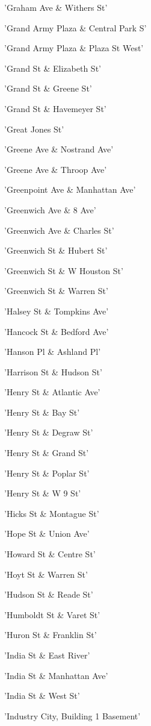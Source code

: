\documentclass[11pt]{article}
\begin{document}
\begin{enumerate*}
\item 'Graham Ave \& Withers St'
\item 'Grand Army Plaza \& Central Park S'
\item 'Grand Army Plaza \& Plaza St West'
\item 'Grand St \& Elizabeth St'
\item 'Grand St \& Greene St'
\item 'Grand St \& Havemeyer St'
\item 'Great Jones St'
\item 'Greene Ave \& Nostrand Ave'
\item 'Greene Ave \& Throop Ave'
\item 'Greenpoint Ave \& Manhattan Ave'
\item 'Greenwich Ave \& 8 Ave'
\item 'Greenwich Ave \& Charles St'
\item 'Greenwich St \& Hubert St'
\item 'Greenwich St \& W Houston St'
\item 'Greenwich St \& Warren St'
\item 'Halsey St \& Tompkins Ave'
\item 'Hancock St \& Bedford Ave'
\item 'Hanson Pl \& Ashland Pl'
\item 'Harrison St \& Hudson St'
\item 'Henry St \& Atlantic Ave'
\item 'Henry St \& Bay St'
\item 'Henry St \& Degraw St'
\item 'Henry St \& Grand St'
\item 'Henry St \& Poplar St'
\item 'Henry St \& W 9 St'
\item 'Hicks St \& Montague St'
\item 'Hope St \& Union Ave'
\item 'Howard St \& Centre St'
\item 'Hoyt St \& Warren St'
\item 'Hudson St \& Reade St'
\item 'Humboldt St \& Varet St'
\item 'Huron St \& Franklin St'
\item 'India St \& East River'
\item 'India St \& Manhattan Ave'
\item 'India St \& West St'
\item 'Industry City, Building 1 Basement'

\end{enumerate*}
\end{document}
